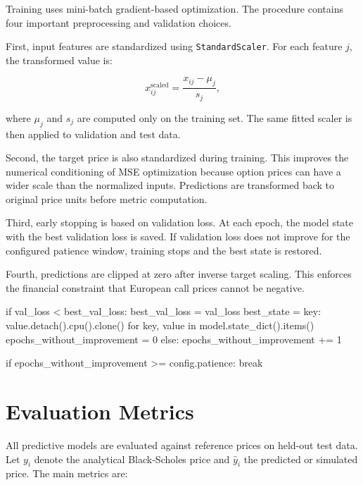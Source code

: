 Training uses mini-batch gradient-based optimization.
The procedure contains four important preprocessing and validation choices.

First, input features are standardized using \texttt{StandardScaler}.
For each feature $j$, the transformed value is:

\begin{equation}
    x_{ij}^{\mathrm{scaled}}
    =
    \frac{x_{ij} - \mu_j}{s_j},
\end{equation}

where $\mu_j$ and $s_j$ are computed only on the training set.
The same fitted scaler is then applied to validation and test data.

Second, the target price is also standardized during training.
This improves the numerical conditioning of MSE optimization because option prices can have a wider scale than the normalized inputs.
Predictions are transformed back to original price units before metric computation.

Third, early stopping is based on validation loss.
At each epoch, the model state with the best validation loss is saved.
If validation loss does not improve for the configured patience window, training stops and the best state is restored.

Fourth, predictions are clipped at zero after inverse target scaling.
This enforces the financial constraint that European call prices cannot be negative.

\begin{projectlistingbox}
if val_loss < best_val_loss:
    best_val_loss = val_loss
    best_state = {
        key: value.detach().cpu().clone()
        for key, value in model.state_dict().items()
    }
    epochs_without_improvement = 0
else:
    epochs_without_improvement += 1

if epochs_without_improvement >= config.patience:
    break
\end{projectlistingbox}

\section{Evaluation Metrics}

All predictive models are evaluated against reference prices on held-out test data.
Let $y_i$ denote the analytical Black-Scholes price and $\hat{y}_i$ the predicted or simulated price.
The main metrics are:


